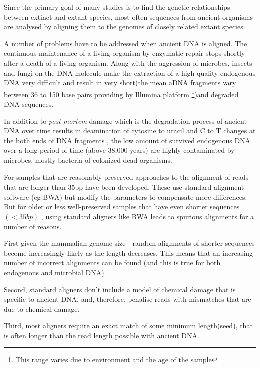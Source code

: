 \documentclass[11pt,a4paper]{report}
\begin{document}
Since the primary goal of many studies is to find the genetic 
relationships between extinct and extant species, most often sequences 
from ancient organisms are analysed by aligning them to the genomes of 
closely related extant species\cite{Neanthertal}\cite{AncientDNA}.

A number of problems have to be addressed when ancient DNA is aligned.
The continuous maintenance of a living organism by enzymatic repair stops 
shortly after a death of a living organism. Along with the aggression of
microbes, insects and fungi on the DNA molecule make the extraction of a 
high-quality endogenous DNA very difficult and result in very short(the 
mean aDNA fragments vary between 36 to 150 base pairs providing by Illumina 
platform\cite{rizzi2012ancient} \footnote{This range varies due to environment 
and the age of the sample})and degraded DNA sequences\cite{paabo2004genetic}.
 
In addition to \emph{post-mortem} damage which is the degradation process of
ancient DNA over time results in deamination of cytosine to uracil and C to T 
changes at the both ends of DNA fragments \cite{futureofaDNA}, the low amount 
of survived endogenous DNA over a long period of time (above 38,000 years) 
are highly contaminated \cite{paabo2004genetic}\cite{aDNA}
by microbes, mostly bacteria of colonized dead organisms.

For samples that are reasonably preserved approaches to the alignment
of reads that are longer than 35bp have been developed. 
These use standard alignment software (eg BWA) but modify the parameters 
to compensate more differences.
But for older or less well-preserved samples that have even shorter 
sequences $(<35 bp)$ \cite{meyer2014mitochondrial},
using standard aligners like BWA leads to spurious alignments for a 
number of reasons.

First given the mammalian genome size - random alignments of shorter 
sequences become increasingly likely as the length decreases. 
This means that an increasing number of incorrect alignments can be 
found (and this is true for both endogenous and microbial DNA).

Second, standard aligners don't include a model of chemical damage that 
is specific to ancient DNA, and, therefore, penalise reads with mismatches
that are due to chemical damage.

Third, most aligners require an exact match of some minimum length(seed), 
that is often longer than the read length possible with ancient DNA.
\end{document}

